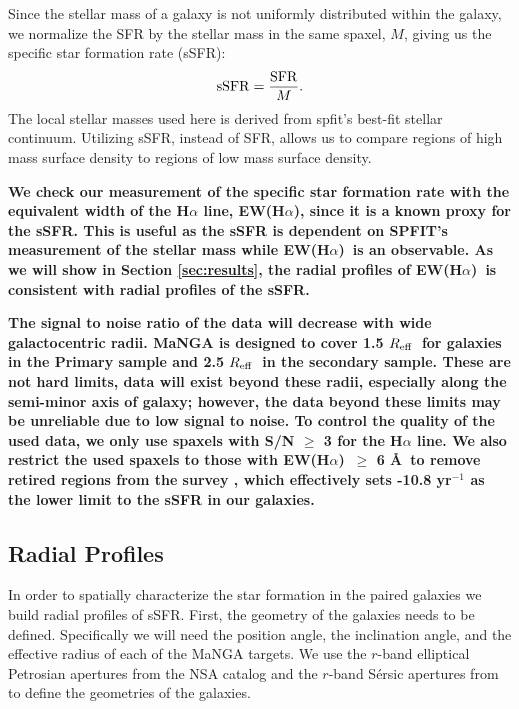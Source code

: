 \documentclass[iop,revtex4,twocolumn,apj,numberedappendix,appendixfloats]{emulateapj}
\newcommand{\reff}{$R_{\rm eff}$}
\newcommand{\ewha}{EW(H$\alpha$)}
\begin{document}
Since the stellar mass of a galaxy is not uniformly distributed within the galaxy, we normalize the SFR by the stellar mass in the same spaxel, $M$, giving us the specific star formation rate (sSFR):
\begin{equation}
{\rm sSFR} = \frac{\rm SFR}{M}.
\end{equation}
The local stellar masses used here is derived from {\sc spfit}'s best-fit stellar continuum. Utilizing sSFR, instead of SFR, allows us to compare regions of high mass surface density to regions of low mass surface density. 

\textbf{
We check our measurement of the specific star formation rate with the equivalent width of the H$\alpha$ line, \ewha, since it is a known proxy for the sSFR. This is useful as the sSFR is dependent on {\sc SPFIT}'s measurement of the stellar mass while \ewha\ is an observable. As we will show in Section \ref{sec:results}, the radial profiles of \ewha\ is consistent with radial profiles of the sSFR.
}

\textbf{
The signal to noise ratio of the data will decrease with wide galactocentric radii. MaNGA is designed to cover 1.5 \reff\ for galaxies in the Primary sample and 2.5 \reff\ in the secondary sample. These are not hard limits, data will exist beyond these radii, especially along the semi-minor axis of galaxy; however, the data beyond these limits may be unreliable due to low signal to noise. To control the quality of the used data, we only use spaxels with S/N $\ge$ 3 for the H$\alpha$ line. We also restrict the used spaxels to those with \ewha\ $\ge$ 6 \AA\ to remove retired regions from the survey \citep{Cid-Fernandes:2011}, which effectively sets -10.8 yr$^{-1}$ as the lower limit to the sSFR in our galaxies.
}

\subsection{Radial Profiles}\label{sec:radial}

In order to spatially characterize the star formation in the paired galaxies we build radial profiles of sSFR. First, the geometry of the galaxies needs to be defined. Specifically we will need the position angle, the inclination angle, and the effective radius of each of the MaNGA targets. We use the $r$-band elliptical Petrosian apertures from the NSA catalog and the $r$-band S\'ersic apertures from \citet{Simard:2011} to define the geometries of the galaxies. 
\end{document}
